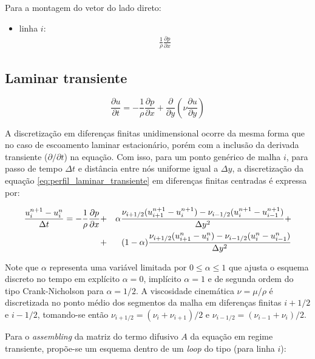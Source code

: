 Para a montagem do vetor do lado direto:

\begin{itemize}
	\item{linha $i$:}
		\begin{eqnarray}
			\frac{1}{\rho}\frac{\partial p}{\partial x} 
		\end{eqnarray}
\end{itemize}


\subsection{Laminar transiente}

\begin{equation}
	\frac{\partial u}{\partial t}
	=
	- \frac{1}{\rho} \frac{\partial p}{\partial x}
	+ \frac{\partial}{\partial y}\left( \nu \frac{\partial u}{\partial y}\right)
\end{equation}

A discretização em diferenças finitas unidimensional ocorre da mesma forma
que no caso de escoamento laminar estacionário, porém com a inclusão da
derivada transiente ($\partial /\partial t$) na equação. Com isso, para
um ponto genérico de malha $i$, para passo de tempo $\Delta t$ e
distância entre nós uniforme igual a $\Delta y$, a discretização da
equação \ref{eq:perfil_laminar_transiente} em diferenças finitas
centradas é expressa por:

\begin{eqnarray}
  \frac{u_i^{n+1}-u_i^n}{\Delta t} = -\frac{1}{\rho}\frac{\partial p}{\partial x} &+&
  \alpha\frac{\nu_{i+1/2}(u_{i+1}^{n+1}-u_{i}^{n+1})
  -\nu_{i-1/2}(u_{i}^{n+1}-u_{i-1}^{n+1})}{\Delta y^2} +\nonumber\\ &+&
  (1-\alpha)\frac{\nu_{i+1/2}(u_{i+1}^n-u_{i}^n)
  -\nu_{i-1/2}(u_{i}^n-u_{i-1}^n)}{\Delta y^2}
  \label{eq:perfil_turbulento_discr}
\end{eqnarray}

Note que $\alpha$ representa uma variável limitada por $0\leq\alpha\leq
1$ que ajusta o esquema discreto no tempo em explícito $\alpha=0$,
implícito $\alpha=1$ e de segunda ordem do tipo Crank-Nicholson para
$\alpha=1/2$. A viscosidade cinemática $\nu = \mu / \rho$ é
discretizada no ponto médio dos segmentos da malha em diferenças finitas
$i+1/2$ e $i-1/2$, tomando-se então $\nu_{i+1/2} =
(\nu_{i}+\nu_{i+1})/2$ e $\nu_{i-1/2} = (\nu_{i-1}+\nu_{i})/2$.

Para o \emph{assembling} da matriz do termo difusivo $A$ da
equação em regime transiente, propõe-se um esquema dentro de um \emph{loop} do tipo (para linha $i$):

